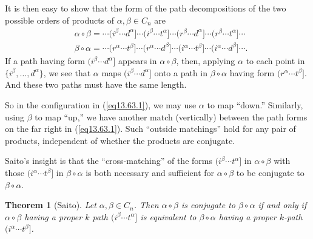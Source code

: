 \documentclass{surv-l}
\numberwithin{equation}{section}
\numberwithin{table}{section}
\numberwithin{figure}{section}
\theoremstyle{plain}
\newtheorem{theorem}[equation]{Theorem}
\theoremstyle{definition}
\begin{document}
It is then easy to show that the form of the
path decompositions of the two possible orders
of products of $\alpha,\beta\in C_{n}$ are
\begin{equation}\label{eq13.63.1}
\begin{split}
&\alpha \circ\beta=\cdots(i^{\beta}\cdots d^{\alpha}]
\cdots(i^{\beta}\cdots t^{\alpha}]\cdots(r^{\beta}\cdots d^{\alpha}]
\cdots(r^{\beta}\cdots t^{\alpha}]\cdots \\
&\beta \circ\alpha=\cdots(r^{\alpha}\cdots t^{\beta}]\cdots(r^{\alpha}
\cdots d^{\beta}]\cdots(i^{\alpha}\cdots t^{\beta}]\cdots(i^{\alpha}\cdots d^{\beta}]\cdots.
\end{split}
\end{equation}
If a path having form $(i^{\beta}\cdots d^{\alpha}]$ appears
in $\alpha\circ\beta$, then, applying $\alpha$ to each point
in $\{i^{\beta},\ldots, d^{\alpha}\}$, we see that $\alpha$
maps $(i^{\beta}\cdots d^{\alpha}]$ onto a path in $\beta
\circ\alpha$ having form $(r^{\alpha}\cdots t^{\beta}]$. And
these two paths must have the same length.

So in the configuration in (\ref{eq13.63.1}), we may use $\alpha$
to map ``down.'' Similarly, using $\beta$ to map ``up,'' we have
another match (vertically) between the path forms on the far right
in (\ref{eq13.63.1}). Such ``outside matchings'' hold for any pair
of products, independent of whether the products are conjugate.

Saito's insight is that the ``cross-matching'' of the forms
$(i^{\beta}\cdots t^{\alpha}]$ in $\alpha \circ\beta$ with those
$(i^{\alpha}\cdots t^{\beta}]$ in $\beta \circ\alpha$ is both
necessary and sufficient for $\alpha \circ\beta$ to be conjugate
to $\beta \circ\alpha$.

\begin{theorem}[Saito]\label{thm13.63.2}
Let $\alpha,\beta\in C_{n}$. Then $\alpha \circ\beta$ is
conjugate to $\beta \circ\alpha$ if and only if
$\alpha\circ\beta$ having a proper $k$ path $(i^{\beta}\cdots
t^{\alpha}]$ is equivalent to $\beta \circ\alpha$ having a
proper $k$-path $(i^{\alpha}\cdots t^{\beta}]$.
\end{theorem}
\end{document}

